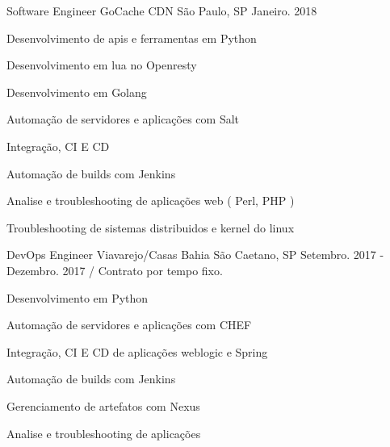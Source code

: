 

\begin{cventries}
  \cventry
    {Software Engineer} %
    {GoCache CDN} %
    {São Paulo, SP} %
    {Janeiro. 2018} %
    {
      \begin{cvitems} %
       \item {Desenvolvimento de apis e ferramentas em Python}
       \item {Desenvolvimento em lua no Openresty}
       \item {Desenvolvimento em Golang}
       \item {Automação de servidores e aplicações com Salt}
       \item {Integração, CI E CD }
       \item {Automação de builds com Jenkins}
       \item {Analise e troubleshooting de aplicações web ( Perl, PHP )}
       \item {Troubleshooting de sistemas distribuidos e kernel do linux}
      \end{cvitems}
    }

  \cventry
    {DevOps Engineer} %
    {Viavarejo/Casas Bahia} %
    {São Caetano, SP} %
    {Setembro. 2017 - Dezembro. 2017 / Contrato por tempo fixo.} %
    {
      \begin{cvitems} %
        \item {Desenvolvimento em Python}
        \item {Automação de servidores e aplicações com CHEF}
    \item {Integração, CI E CD de aplicações weblogic e Spring}
	\item {Automação de builds com Jenkins}
	\item {Gerenciamento de artefatos com Nexus}
        \item {Analise e troubleshooting de aplicações}
      \end{cvitems}
    }



\end{cventries}

